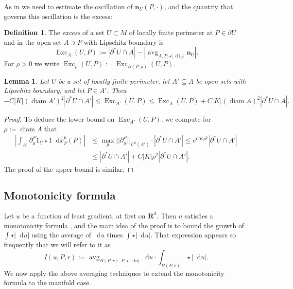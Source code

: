 \documentclass[reqno,10pt]{amsart}
\newcommand{\RR}{\mathbf{R}}
\DeclareMathOperator{\avg}{avg}
\DeclareMathOperator{\diam}{diam}
\DeclareMathOperator{\Exc}{Exc}
\newcommand*\dif{\mathop{}\!\mathrm{d}}
\newcommand{\normal}{\mathbf n}
\newcommand{\dfn}[1]{\emph{#1}\index{#1}}
\newtheorem{lemma}[theorem]{Lemma}
\theoremstyle{definition}
\newtheorem{definition}[theorem]{Definition}
\numberwithin{equation}{section}
\begin{document}
As in \cite[Chapters 8-9]{Giusti77} we need to estimate the oscillation of $\normal_U(P, \cdot)$, and the quantity that governs this oscillation is the excess:

\begin{definition}
The \dfn{excess} of a set $U \subset M$ of locally finite perimeter at $P \in \partial U$ and in the open set $A \ni P$ with Lipschitz boundary is
$$\Exc_A(U, P) := |\partial^* U \cap A| - \left|\avg_{A, P, \star |\dif 1_U|} \normal_U\right|.$$
For $\rho > 0$ we write $\Exc_\rho(U, P) := \Exc_{B(P, \rho)}(U, P)$.
\end{definition}

\begin{lemma}
Let $U$ be a set of locally finite perimeter, let $A' \subseteq A$ be open sets with Lipschitz boundary, and let $P \in A'$. Then
\begin{equation}\label{approximate monotone}
-C |K| (\diam A')^2 |\partial^* U \cap A'| \leq \Exc_{A'}(U, P) \leq \Exc_A(U, P) + C |K|(\diam A)^2 |\partial^* U \cap A|.
\end{equation}
\end{lemma}
\begin{proof}
To deduce the lower bound on $\Exc_{A'}(U, P)$, we compute for $\rho := \diam A$ that
\begin{align*}
    \left|\int_{A'} \partial^P_\mu 1_U \star 1 \dif x_P^\mu(P)\right|
 & \leq \max_\mu ||\partial^P_\mu||_{C^0(A')} \cdot |\partial^* U \cap A'| \leq e^{CK\rho^2} |\partial^* U \cap A'| \\
 & \leq |\partial^* U \cap A'| + C|K|\rho^2 |\partial^* U \cap A'|.
\end{align*}
The proof of the upper bound is similar.
\end{proof}


\subsection{Monotonicity formula}\label{MollifierSection}
Let $u$ be a function of least gradient, at first on $\RR^d$.
Then $u$ satisfies a monotonicity formula \cite[Theorem 5.12]{Giusti77}, and the main idea of the proof is to bound the growth of $\int \star |\dif u|$ using the average of $\dif u$ times $\int \star |\dif u|$.
That expression appears so frequently that we will refer to it as
\begin{equation}\label{integral of du}
I(u, P, r) := \avg_{B(P, r), P, \star |\dif u|} \dif u \cdot \int_{B(P, r)} \star |\dif u|.
\end{equation}
We now apply the above averaging techniques to extend the monotonicity formula to the manifold case.
\end{document}
